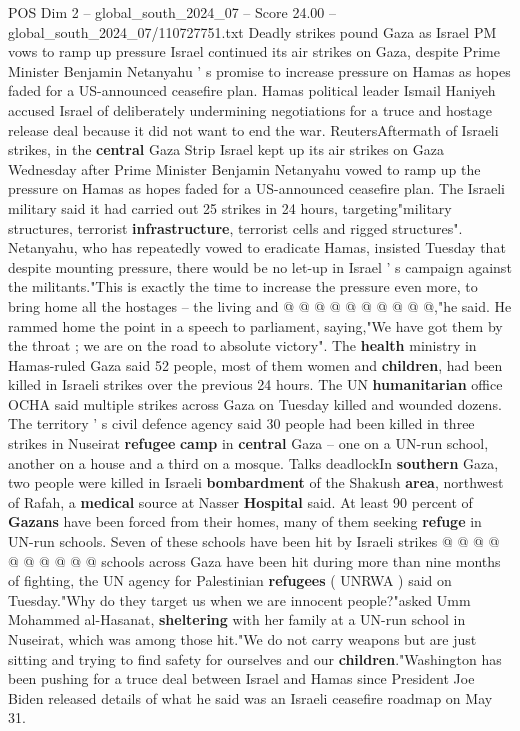 \begin{textsample}{POS Dim 2 – global\_south\_2024\_07 – Score 24.00 – global\_south\_2024\_07/110727751.txt}  \label{ex:f2_pos_170}
Deadly strikes pound Gaza as Israel PM vows to ramp up pressure Israel continued its air strikes on Gaza, despite Prime Minister Benjamin Netanyahu ' s promise to increase pressure on Hamas as hopes faded for a US-announced ceasefire plan.
Hamas political leader Ismail Haniyeh accused Israel of deliberately undermining negotiations for a truce and hostage release deal because it did not want to end the war.
ReutersAftermath of Israeli strikes, in the \textbf{central} Gaza Strip Israel kept up its air strikes on Gaza Wednesday after Prime Minister Benjamin Netanyahu vowed to ramp up the pressure on Hamas as hopes faded for a US-announced ceasefire plan.
The Israeli military said it had carried out 25 strikes in 24 hours, targeting"military structures, terrorist \textbf{infrastructure}, terrorist cells and rigged structures".
Netanyahu, who has repeatedly vowed to eradicate Hamas, insisted Tuesday that despite mounting pressure, there would be no let-up in Israel ' s campaign against the militants."This is exactly the time to increase the pressure even more, to bring home all the hostages -- the living and @ @ @ @ @ @ @ @ @ @,"he said.
He rammed home the point in a speech to parliament, saying,"We have got them by the throat ; we are on the road to absolute victory".
The \textbf{health} ministry in Hamas-ruled Gaza said 52 people, most of them women and \textbf{children}, had been killed in Israeli strikes over the previous 24 hours.
The UN \textbf{humanitarian} office OCHA said multiple strikes across Gaza on Tuesday killed and wounded dozens.
The territory ' s civil defence agency said 30 people had been killed in three strikes in Nuseirat \textbf{refugee} \textbf{camp} in \textbf{central} Gaza -- one on a UN-run school, another on a house and a third on a mosque.
Talks deadlockIn \textbf{southern} Gaza, two people were killed in Israeli \textbf{bombardment} of the Shakush \textbf{area}, northwest of Rafah, a \textbf{medical} source at Nasser \textbf{Hospital} said.
At least 90 percent of \textbf{Gazans} have been forced from their homes, many of them seeking \textbf{refuge} in UN-run schools.
Seven of these schools have been hit by Israeli strikes @ @ @ @ @ @ @ @ @ @ schools across Gaza have been hit during more than nine months of fighting, the UN agency for Palestinian \textbf{refugees} ( UNRWA ) said on Tuesday."Why do they target us when we are innocent people?"asked Umm Mohammed al-Hasanat, \textbf{sheltering} with her family at a UN-run school in Nuseirat, which was among those hit."We do not carry weapons but are just sitting and trying to find safety for ourselves and our \textbf{children}."Washington has been pushing for a truce deal between Israel and Hamas since President Joe Biden released details of what he said was an Israeli ceasefire roadmap on May 31.

\end{textsample}
